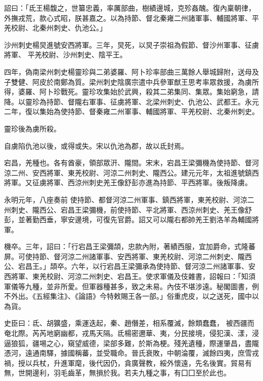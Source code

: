 \begin{pinyinscope}
 詔曰：「氐王楊馥之，世纂忠義，率厲部曲，樹績邊城，克殄姦醜。復內稟朝律，外撫戎荒，款心式昭，朕甚嘉之。以為持節、督北秦雍二州諸軍事、輔國將軍、平羌校尉、北秦州刺史、仇池公。」



 沙州刺史楊炅進號安西將軍。三年，炅死，以炅子崇祖為假節、督沙州軍事、征虜將軍、
 平羌校尉、沙州刺史、陰平王。



 四年，偽南梁州刺史楊靈珍與二弟婆羅、阿卜珍率部曲三萬餘人舉城歸附，送母及子雙健、阿皮於南鄭為質。梁州刺史陰廣宗遣中兵參軍猷王思考率眾救援，為虜所得，婆羅、阿卜珍戰死。靈珍攻集始於武興，殺其二弟集同、集眾。集始窮急，請降。以靈珍為持節、督隴右軍事、征虜將軍、北梁州刺史、仇池公、武都王。永元二年，復以集始為使持節、督秦雍二州軍事、輔國將軍、平羌校尉、北秦州刺史。



 靈珍後為虜所殺。



 自虜陷仇池以後，或得或失。宋以仇池為郡，故以氐封焉。



 宕昌，羌種也。各有酋豪，領部眾汧、隴間。宋末，宕昌王梁彌機為使持節、督河涼二州、安西將軍、東羌校尉、河涼二州刺史、隴西公。建元元年，太祖進號鎮西將軍。又征虜將軍、西涼州刺史羌王像舒彭亦進為持節、平西將軍。後叛降虜。



 永明元年，八座奏前
 使持節、都督河涼二州軍事、鎮西將軍，東羌校尉、河涼二州刺史、隴西公、宕昌王梁彌機，前使持節、平北將軍、西涼州刺史、羌王像舒彭，並著勤西垂，寧安邊境，可復先官爵。詔又可以隴右都帥羌王劉洛羊為輔國將軍。



 機卒。三年，詔曰：「行宕昌王梁彌頡，忠款內附，著績西服，宜加爵命，式隆蕃屏。可使持節、督河涼二州諸軍事、安西將軍、東羌校尉、河涼二州刺史、隴西公、宕昌王。」頡卒。六年，以行宕昌王梁彌承為使持節、督河涼二州諸軍事、安西將軍、東羌校尉、河涼二州刺史、宕昌王。使求軍儀及伎雜書，詔報曰：「知須軍儀等九種，並非所愛。但軍器種甚多，致之未易。內伎不堪涉遠。秘閣圖書，例不外出。《五經集注》、《論語》今特敕賜王各一部。」俗重虎皮，以之送死，國中以為貨。



 史臣曰：氐、胡獷盛，乘運迭起，秦、趙僭差，相系覆滅，餘類蠢蠢，
 被西疆而奄北際。芮芮地窮幽都，戎馬天隔。氐楊密邇華、夷，分民接境，侵犯漢、漾，浸逼狼狐，疆埸之心，窺望威德，梁部多難，於斯為梗。殘羌遺種，際運肇昌，盡隴憑河，遠通南驛，據國稱蕃，並受職命。晉氏衰敗，中朝淪覆，滅餘四夷，庶雪戎禍，授以兵杖，升進軍麾，後代因仍，貪廣聲教，綏外懷遠，先名後實。貿易有無，世開邊利，羽毛齒革，無損於我。若夫九種之事，有囗囗至於此也。




\end{pinyinscope}
